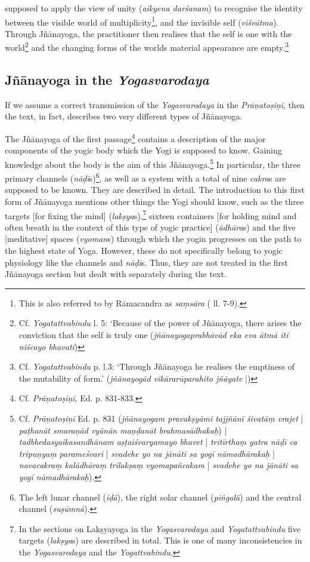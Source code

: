 supposed to apply the view of unity (\textit{aikyena darśanam}) to recognise the identity between the visible world of multiplicity\footnote{This is also referred to by Rāmacandra as \textit{saṃsāra} ( ll. 7-9).}, and the invisible self (\textit{viśvātma}). Through Jñānayoga, the practitioner then realises that the self is one with the world\footnote{Cf. \textit{Yogatattvabindu}  \pageref{svabhava1} l. 5: `Because of the power of Jñānayoga, there arises the conviction that the self is truly one (\textit{jñānayogaprabhāvād eka eva ātmā iti niścayo bhavati})} and the changing forms of the worlds material appearance are empty.\footnote{Cf. \textit{Yogatattvabindu}  p.\pageref{svabhava2} l.3: `Through Jñānayoga he realises the emptiness of the mutability of form.' (\textit{jñānayogād vikārarūparahito jñāyate} |)}

\subsection{Jñānayoga in the \textit{Yogasvarodaya}}

If we assume a correct transmission of the \textit{Yogasvarodaya} in the \textit{Prāṇatoṣiṇī}, then the text, in fact, describes two very different types of Jñānayoga. 

The Jñānayoga of the first passage\footnote{Cf. \textit{Prāṇatoṣiṇī}, Ed. p. 831-833.} contains a description of the major components of the yogic body which the Yogi is supposed to know. Gaining knowledge about the body is the aim of this Jñānayoga.\footnote{Cf. \textit{Prāṇatoṣiṇī} Ed. p. 831 (\textit{jñānayogam pravakṣyāmi tajjñānī śivatāṃ vrajet} | \textit{paṭhanāt smaraṇād vyānān maṇḍanāt brahmasādhakaḥ}) | \textit{tadbhedasyaikasandhānam aṣṭaiśvaryamayo bhavet} | \textit{tritīrthaṃ yatra nāḍī ca tripuṇyaṃ parameśvari} | \textit{svadehe yo na jānāti sa yogī nāmadhārakaḥ} | \textit{navacakraṃ kalādhāraṃ trilakṣaṃ vyomapañcakam} | \textit{svadehe yo na jānāti sa yogī nāmadhārakaḥ}).} In particular, the three primary channels (\textit{nāḍī}s)\footnote{The left lunar channel (\textit{iḍā}), the right solar channel (\textit{piṅgalā}) and the central channel (\textit{suṣūmnā}).}, as well as a system with a total of nine \textit{cakra}s are supposed to be known. They are described in detail. The introduction to this first form of Jñānayoga mentions other things the Yogi should know, such as the three targets [for fixing the mind] (\textit{lakṣya}s),\footnote{In the sections on Lakṣyayoga in the \textit{Yogasvarodaya} and \textit{Yogatattvabindu} five targets (\textit{lakṣya}s) are described in total. This is one of many inconsistencies in the \textit{Yogasvarodaya} and the \textit{Yogattvabindu}.} sixteen containers [for holding mind and often breath in the context of this type of yogic practice] (\textit{ādhāra}s) and the five [meditative] spaces (\textit{vyoman}s) through which the yogin progresses on the path to the highest state of Yoga. However, these do not specifically belong to yogic physiology like the channels and \textit{nāḍī}s. Thus, they are not treated in the first Jñānayoga section but dealt with separately during the text.

